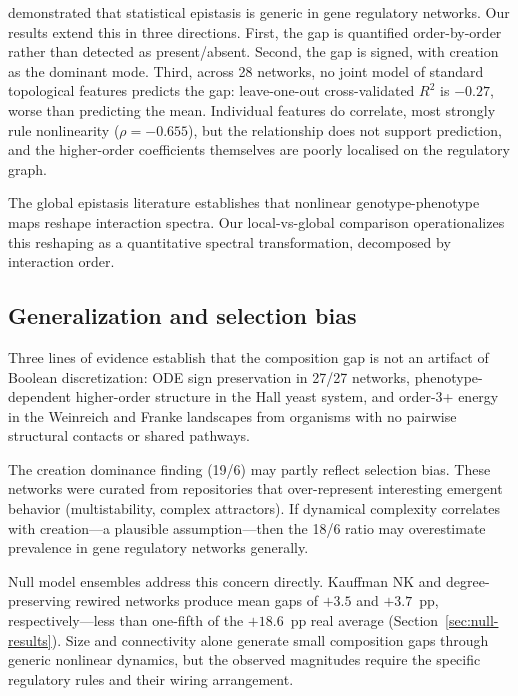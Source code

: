 \documentclass[10pt]{article}
\begin{document}
\citet{gjuvsland2007statistical} demonstrated that
statistical epistasis is generic in gene regulatory networks. Our
results extend this in three directions. First, the gap is quantified
order-by-order rather than detected as present/absent. Second, the
gap is signed, with creation as the dominant mode. Third, across 28
networks, no joint model of standard topological features predicts the
gap: leave-one-out cross-validated $R^2$ is $-0.27$, worse than
predicting the mean. Individual features do correlate, most strongly
rule nonlinearity ($\rho = -0.655$), but the relationship does not
support prediction, and the higher-order coefficients themselves are
poorly localised on the regulatory graph.

The global epistasis literature \citep{otwinowski2018inferring, reddy2021global} establishes that nonlinear genotype-phenotype maps
reshape interaction spectra. Our local-vs-global comparison
operationalizes this reshaping as a quantitative spectral
transformation, decomposed by interaction order.


\subsection{Generalization and selection bias}

Three lines of evidence establish that the composition gap is not an
artifact of Boolean discretization: ODE sign preservation in 27/27
networks, phenotype-dependent higher-order structure in the Hall
yeast system, and order-3+ energy in the Weinreich and Franke
landscapes from organisms with no pairwise structural contacts or
shared pathways.

The creation dominance finding (19/6) may partly reflect selection
bias. These networks were curated from repositories that
over-represent interesting emergent behavior (multistability, complex
attractors). If dynamical complexity correlates with creation---a
plausible assumption---then the 18/6 ratio may overestimate
prevalence in gene regulatory networks generally.

Null model ensembles address this concern directly. Kauffman NK and
degree-preserving rewired networks produce mean gaps of $+3.5$ and
$+3.7$~pp, respectively---less than one-fifth of the $+18.6$~pp
real average (Section~\ref{sec:null-results}). Size and connectivity
alone generate small composition gaps through generic nonlinear
dynamics, but the observed magnitudes require the specific regulatory
rules and their wiring arrangement.
\end{document}
